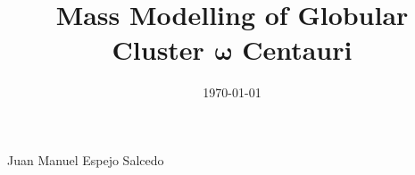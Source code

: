 \documentclass[a4paper, 11pt, oneside]{Thesis}  %
\begin{document}
\frontmatter      %

\title  {Mass Modelling of Globular Cluster $\mathbf{\omega}$ Centauri}
            
\authors  
            {{Juan Manuel Espejo Salcedo}}
            
           
\addresses  {\groupname\\\deptname\\\univname}  %
\date       {\today}
\subject    {}
\keywords   {}

\maketitle


\fancyhead{}  %
\rhead{\thepage}  %
\lhead{}  %

\pagestyle{fancy}  %




 
\end{document}
